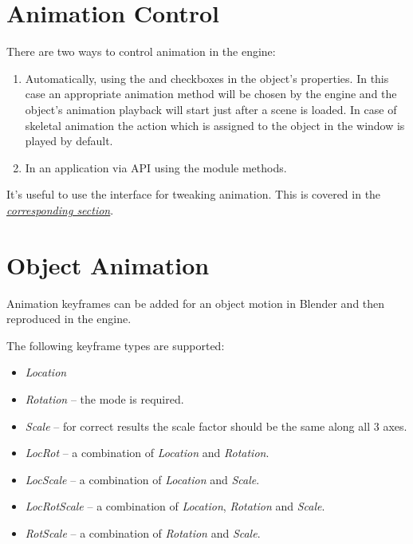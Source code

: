 \documentclass[a4paper,12pt,oneside]{sphinxmanual}
\begin{document}
\section{Animation Control}
\label{animation:id2}
There are two ways to control animation in the engine:
\begin{enumerate}
\item {} 
Automatically, using the  and  checkboxes in the object's properties. In this case an appropriate animation method will be chosen by the engine and the object's animation playback will start just after a scene is loaded. In case of skeletal animation the action which is assigned to the object in the  window is played by default.

\item {} 
In an application via API using the  module methods.

\end{enumerate}

It's useful to use the  interface for tweaking animation. This is covered in the {\hyperref[viewer:viewer]{\emph{corresponding section}}}.


\section{Object Animation}
\label{animation:id3}
Animation keyframes can be added for an object motion in Blender and then reproduced in the engine.

The following keyframe types are supported:
\begin{itemize}
\item {} 
\emph{Location}

\item {} 
\emph{Rotation} -- the  mode is required.

\item {} 
\emph{Scale} -- for correct results the scale factor should be the same along all 3 axes.

\item {} 
\emph{LocRot} -- a combination of \emph{Location} and \emph{Rotation}.

\item {} 
\emph{LocScale} -- a combination of \emph{Location} and \emph{Scale}.

\item {} 
\emph{LocRotScale} -- a combination of \emph{Location}, \emph{Rotation} and \emph{Scale}.

\item {} 
\emph{RotScale} -- a combination of \emph{Rotation} and \emph{Scale}.

\end{itemize}
\end{document}
